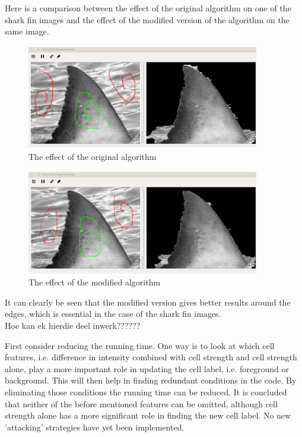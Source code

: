 \documentclass[a4paper,10pt]{article}
\begin{document}
\newpage
\noindent Here is a comparison between the effect of the original algorithm on one of the shark fin images and the effect of the modified version of the algorithm on the same image.
\begin{figure}[H]
 \centering
 \includegraphics[width=4in, height=1.8in]{haaio}
 \caption{The effect of the original algorithm}
 \label{fin1}
\end{figure}

\begin{figure}[H]
 \centering
 \includegraphics[width=4in, height=1.8in]{haaim}
 \caption{The effect of the modified algorithm}
 \label{fin}
\end{figure}

\noindent It can clearly be seen that the modified version gives better results around the edges, which is essential in the case of the shark fin images. \\ 

Hoe kan ek hierdie deel inwerk??????

First consider reducing the running time.  One way is to look at which cell features, i.e. difference in intensity combined with cell strength 
and cell strength alone, play a more important role in updating the cell label, i.e. foreground or background.   This will then help in finding 
redundant conditions in the code.  By eliminating those conditions the running time can be reduced.  It is concluded that neither of the before
mentioned features can be omitted, although cell strength alone has a more significant role in finding the new cell label.  No new 'attacking' 
strategies have yet been implemented. \\
\end{document}
